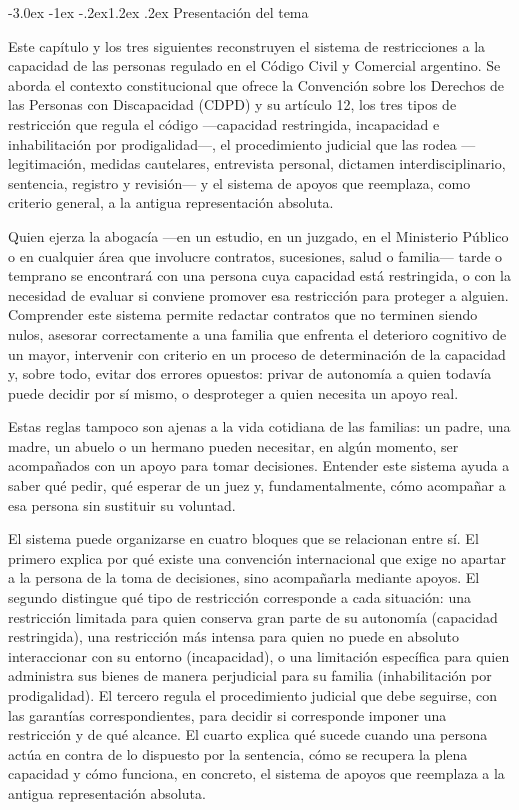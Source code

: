 \documentclass[12pt,oneside]{book}
\makeatletter
\renewcommand\section{\@startsection{section}{1}{\z@}%
  {-3.0ex \@plus -1ex \@minus -.2ex}{1.2ex \@plus .2ex}%
  {\normalfont\large\bfseries\color{acento}}}
\makeatother
\begin{document}
\section{Presentación del tema}

Este capítulo y los tres siguientes reconstruyen el sistema de restricciones a la capacidad de las personas regulado en el Código Civil y Comercial argentino. Se aborda el contexto constitucional que ofrece la Convención sobre los Derechos de las Personas con Discapacidad (CDPD) y su artículo 12, los tres tipos de restricción que regula el código ---capacidad restringida, incapacidad e inhabilitación por prodigalidad---, el procedimiento judicial que las rodea ---legitimación, medidas cautelares, entrevista personal, dictamen interdisciplinario, sentencia, registro y revisión--- y el sistema de apoyos que reemplaza, como criterio general, a la antigua representación absoluta.

Quien ejerza la abogacía ---en un estudio, en un juzgado, en el Ministerio Público o en cualquier área que involucre contratos, sucesiones, salud o familia--- tarde o temprano se encontrará con una persona cuya capacidad está restringida, o con la necesidad de evaluar si conviene promover esa restricción para proteger a alguien. Comprender este sistema permite redactar contratos que no terminen siendo nulos, asesorar correctamente a una familia que enfrenta el deterioro cognitivo de un mayor, intervenir con criterio en un proceso de determinación de la capacidad y, sobre todo, evitar dos errores opuestos: privar de autonomía a quien todavía puede decidir por sí mismo, o desproteger a quien necesita un apoyo real.

Estas reglas tampoco son ajenas a la vida cotidiana de las familias: un padre, una madre, un abuelo o un hermano pueden necesitar, en algún momento, ser acompañados con un apoyo para tomar decisiones. Entender este sistema ayuda a saber qué pedir, qué esperar de un juez y, fundamentalmente, cómo acompañar a esa persona sin sustituir su voluntad.

\begin{nota}
El sistema puede organizarse en cuatro bloques que se relacionan entre sí. El primero explica por qué existe una convención internacional que exige no apartar a la persona de la toma de decisiones, sino acompañarla mediante apoyos. El segundo distingue qué tipo de restricción corresponde a cada situación: una restricción limitada para quien conserva gran parte de su autonomía (capacidad restringida), una restricción más intensa para quien no puede en absoluto interaccionar con su entorno (incapacidad), o una limitación específica para quien administra sus bienes de manera perjudicial para su familia (inhabilitación por prodigalidad). El tercero regula el procedimiento judicial que debe seguirse, con las garantías correspondientes, para decidir si corresponde imponer una restricción y de qué alcance. El cuarto explica qué sucede cuando una persona actúa en contra de lo dispuesto por la sentencia, cómo se recupera la plena capacidad y cómo funciona, en concreto, el sistema de apoyos que reemplaza a la antigua representación absoluta.
\end{nota}
\end{document}
